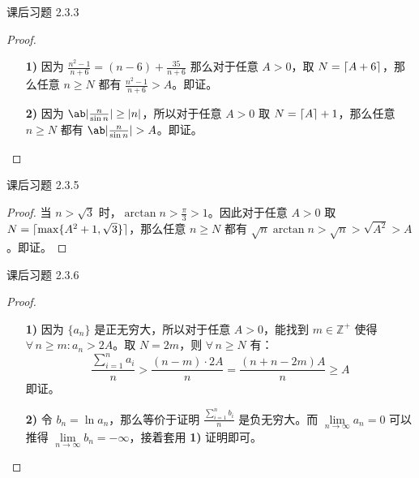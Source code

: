 \begin{problem}
	课后习题 2.3.3

	\begin{proof}
		\begin{enumerate}
			\item[\textbf{1)}] 因为 $\frac{n^2 - 1}{n + 6} = (n - 6) + \frac{35}{n + 6}$ 那么对于任意 $A > 0$，取 $N = \lceil A + 6\rceil$，那么任意 $n \ge N$ 都有 $\frac{n^2 - 1}{n + 6} > A$。即证。

			\item[\textbf{2)}] 因为 $\ab|\frac{n}{\sin n}| \ge |n|$，所以对于任意 $A > 0$ 取 $N = \lceil A\rceil + 1$，那么任意 $n \ge N$ 都有 $\ab|\frac{n}{\sin n}| > A$。即证。
		\end{enumerate}
	\end{proof}
\end{problem}

\begin{problem}
	课后习题 2.3.5

	\begin{proof}
		当 $n > \sqrt 3$ 时，$\arctan n > \frac{\pi}{3} > 1$。因此对于任意 $A > 0$ 取 $N = \lceil\max\{A^2 + 1, \sqrt 3\}\rceil$，那么任意 $n \ge N$ 都有 $\sqrt n \arctan n > \sqrt n > \sqrt{A^2} > A$。即证。 
	\end{proof}
\end{problem}

\begin{problem}
	课后习题 2.3.6

	\begin{proof}
		\begin{enumerate}
			\item[\textbf{1)}] 因为 $\{a_n\}$ 是正无穷大，所以对于任意 $A > 0$，能找到 $m \in \mathbb{Z}^+$ 使得 $\forall\,n \ge m: a_n > 2A$。取 $N = 2m$，则 $\forall\,n \ge N$ 有：
			$$
			\frac{\sum_{i=1}^n a_i}{n} > \frac{(n - m) \cdot 2A}{n} = \frac{(n + n - 2m)A}{n} \ge A
			$$
			即证。

			\item[\textbf{2)}] 令 $b_n = \ln a_n$，那么等价于证明 $\frac{\sum_{i=1}^n b_i}{n}$ 是负无穷大。而 $\lim\limits_{n \to \infty} a_n = 0$ 可以推得 $\lim\limits_{n \to \infty} b_n = -\infty$，接着套用 \textbf{1)} 证明即可。
		\end{enumerate}
	\end{proof}
\end{problem}

